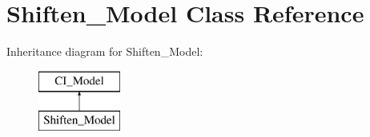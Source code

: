 \hypertarget{class_shiften___model}{}\section{Shiften\+\_\+\+Model Class Reference}
\label{class_shiften___model}
Inheritance diagram for Shiften\+\_\+\+Model\+:\begin{figure}[H]
\begin{center}
\leavevmode
\includegraphics[height=2.000000cm]{class_shiften___model}
\end{center}
\end{figure}
